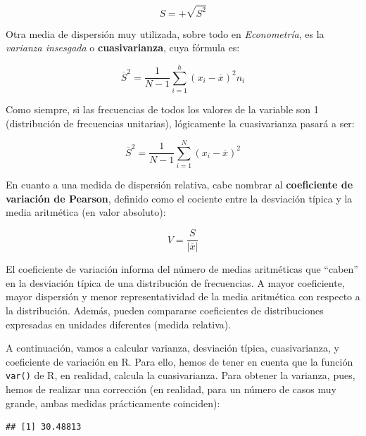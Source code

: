 \documentclass[
]{book}
\newenvironment{Shaded}{\begin{snugshade}}{\end{snugshade}}
\newcommand{\CommentTok}[1]{\textcolor[rgb]{0.56,0.35,0.01}{\textit{#1}}}
\newcommand{\DecValTok}[1]{\textcolor[rgb]{0.00,0.00,0.81}{#1}}
\newcommand{\FunctionTok}[1]{\textcolor[rgb]{0.13,0.29,0.53}{\textbf{#1}}}
\newcommand{\NormalTok}[1]{#1}
\newcommand{\OtherTok}[1]{\textcolor[rgb]{0.56,0.35,0.01}{#1}}
\newcommand{\SpecialCharTok}[1]{\textcolor[rgb]{0.81,0.36,0.00}{\textbf{#1}}}
\begin{document}
\[
S = +\sqrt{S^2}
\]

Otra media de dispersión muy utilizada, sobre todo en \emph{Econometría}, es la \emph{varianza insesgada} o \textbf{cuasivarianza}, cuya fórmula es:

\[
{\overline{S}}^2 = \frac{1}{N-1} \sum_{i=1}^{h} (x_i - \overline{x})^2 n_i
\]

Como siempre, si las frecuencias de todos los valores de la variable son 1 (distribución de frecuencias unitarias), lógicamente la cuasivarianza pasará a ser:

\[
{\overline{S}}^2 = \frac{1}{N-1} \sum_{i=1}^{N} (x_i - \overline{x})^2
\]

En cuanto a una medida de dispersión relativa, cabe nombrar al \textbf{coeficiente de variación de Pearson}, definido como el cociente entre la desviación típica y la media aritmética (en valor absoluto):

\[
V = \frac{S}{|\overline{x}|}
\]

El coeficiente de variación informa del número de medias aritméticas que ``caben'' en la desviación típica de una distribución de frecuencias.
A mayor coeficiente, mayor dispersión y menor representatividad de la media aritmética con respecto a la distribución.
Además, pueden compararse coeficientes de distribuciones expresadas en unidades diferentes (medida relativa).

A continuación, vamos a calcular varianza, desviación típica, cuasivarianza, y coeficiente de variación en R.
Para ello, hemos de tener en cuenta que la función \texttt{var()} de R, en realidad, calcula la cuasivarianza.
Para obtener la varianza, pues, hemos de realizar una corrección (en realidad, para un número de casos muy grande, ambas medidas prácticamente coinciden):

\begin{Shaded}
\end{Shaded}

\begin{verbatim}
## [1] 30.48813
\end{verbatim}
\end{document}
